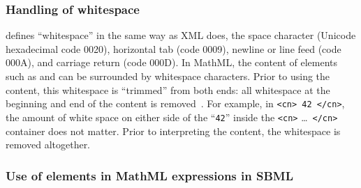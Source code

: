 

\subsubsection{Handling of whitespace}
\label{sec:mathml-whitespace}

\mathmltwo defines ``whitespace'' in the same way as XML does, \ie
the space character (Unicode hexadecimal code 0020), horizontal
tab (code 0009), newline or line feed (code 000A), and carriage
return (code 000D).  In MathML, the content of elements such as
 and  can be surrounded by whitespace
characters.  Prior to using the content, this whitespace is
``trimmed'' from both ends: all whitespace at the beginning and
end of the content is removed~\citep{ausbrooks:2003}.  For
example, in \texttt{<cn> 42 </cn>}, the amount of white space on
either side of the ``\texttt{42}'' inside the \texttt{<cn>}
\ldots\ \texttt{</cn>} container does not matter.  Prior to
interpreting the content, the whitespace is removed altogether.


\subsubsection{Use of  elements in MathML expressions in SBML}
\label{sec:csymbol-token}
\label{sec:csymbol}

